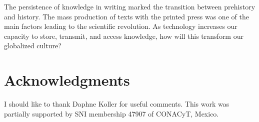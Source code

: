 \documentclass[12pt]{article}
\begin{document}
The persistence of knowledge in writing marked the transition between prehistory and history. The mass production of texts with the printed press was one of the main factors leading to the scientific revolution. As technology increases our capacity to store, transmit, and access knowledge, how will this transform our globalized culture?

\section*{Acknowledgments}

I should like to thank Daphne Koller for useful comments. 
This work was partially supported by SNI membership 47907 of CONACyT, Mexico. 



\end{document}
